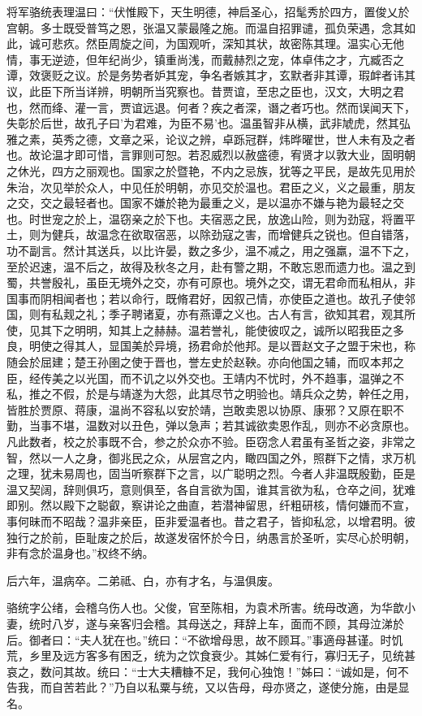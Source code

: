 \documentclass[12pt,UTF8]{ctexbook}
\begin{document}
将军骆统表理温曰：“伏惟殿下，天生明德，神启圣心，招髦秀於四方，置俊乂於宫朝。多士既受普笃之恩，张温又蒙最隆之施。而温自招罪谴，孤负荣遇，念其如此，诚可悲疚。然臣周旋之间，为国观听，深知其状，故密陈其理。温实心无他情，事无逆迹，但年纪尚少，镇重尚浅，而戴赫烈之宠，体卓伟之才，亢臧否之谭，效褒贬之议。於是务势者妒其宠，争名者嫉其才，玄默者非其谭，瑕衅者讳其议，此臣下所当详辨，明朝所当究察也。昔贾谊，至忠之臣也，汉文，大明之君也，然而绛、灌一言，贾谊远退。何者？疾之者深，谮之者巧也。然而误闻天下，失彰於后世，故孔子曰'为君难，为臣不易'也。温虽智非从横，武非虓虎，然其弘雅之素，英秀之德，文章之采，论议之辨，卓跞冠群，炜晔曜世，世人未有及之者也。故论温才即可惜，言罪则可恕。若忍威烈以赦盛德，宥贤才以敦大业，固明朝之休光，四方之丽观也。国家之於暨艳，不内之忌族，犹等之平民，是故先见用於朱治，次见举於众人，中见任於明朝，亦见交於温也。君臣之义，义之最重，朋友之交，交之最轻者也。国家不嫌於艳为最重之义，是以温亦不嫌与艳为最轻之交也。时世宠之於上，温窃亲之於下也。夫宿恶之民，放逸山险，则为劲寇，将置平土，则为健兵，故温念在欲取宿恶，以除劲寇之害，而增健兵之锐也。但自错落，功不副言。然计其送兵，以比许晏，数之多少，温不减之，用之强羸，温不下之，至於迟速，温不后之，故得及秋冬之月，赴有警之期，不敢忘恩而遗力也。温之到蜀，共誉殷礼，虽臣无境外之交，亦有可原也。境外之交，谓无君命而私相从，非国事而阴相闻者也；若以命行，既脩君好，因叙己情，亦使臣之道也。故孔子使邻国，则有私觌之礼；季子聘诸夏，亦有燕谭之义也。古人有言，欲知其君，观其所使，见其下之明明，知其上之赫赫。温若誉礼，能使彼叹之，诚所以昭我臣之多良，明使之得其人，显国美於异境，扬君命於他邦。是以晋赵文子之盟于宋也，称随会於屈建；楚王孙圉之使于晋也，誉左史於赵鞅。亦向他国之辅，而叹本邦之臣，经传美之以光国，而不讥之以外交也。王靖内不忧时，外不趋事，温弹之不私，推之不假，於是与靖遂为大怨，此其尽节之明验也。靖兵众之势，幹任之用，皆胜於贾原、蒋康，温尚不容私以安於靖，岂敢卖恩以协原、康邪？又原在职不勤，当事不堪，温数对以丑色，弹以急声；若其诚欲卖恩作乱，则亦不必贪原也。凡此数者，校之於事既不合，参之於众亦不验。臣窃念人君虽有圣哲之姿，非常之智，然以一人之身，御兆民之众，从层宫之内，瞰四国之外，照群下之情，求万机之理，犹未易周也，固当听察群下之言，以广聪明之烈。今者人非温既殷勤，臣是温又契阔，辞则俱巧，意则俱至，各自言欲为国，谁其言欲为私，仓卒之间，犹难即别。然以殿下之聪叡，察讲论之曲直，若潜神留思，纤粗研核，情何嫌而不宣，事何昧而不昭哉？温非亲臣，臣非爱温者也。昔之君子，皆抑私忿，以增君明。彼独行之於前，臣耻废之於后，故遂发宿怀於今日，纳愚言於圣听，实尽心於明朝，非有念於温身也。”权终不纳。

后六年，温病卒。二弟祗、白，亦有才名，与温俱废。

骆统字公绪，会稽乌伤人也。父俊，官至陈相，为袁术所害。统母改適，为华歆小妻，统时八岁，遂与亲客归会稽。其母送之，拜辞上车，面而不顾，其母泣涕於后。御者曰：“夫人犹在也。”统曰：“不欲增母思，故不顾耳。”事適母甚谨。时饥荒，乡里及远方客多有困乏，统为之饮食衰少。其姊仁爱有行，寡归无子，见统甚哀之，数问其故。统曰：“士大夫糟糠不足，我何心独饱！”姊曰：“诚如是，何不告我，而自苦若此？”乃自以私粟与统，又以告母，母亦贤之，遂使分施，由是显名。
\end{document}
